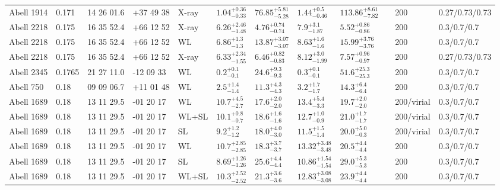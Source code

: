 \begin{landscape}
\begin{center}
{\begin{longtable}{llllllllllll}
Abell 1914 & 0.171 & 14 26 01.6 & +37 49 38 & X-ray & ${1.04}^{+0.36}_{-0.33}$ & ${76.85}^{+5.81}_{-5.28}$ & ${1.44}^{+0.5}_{-0.46}$ & ${113.86}^{+8.61}_{-7.82}$ & \citet{BA14.1} & 200 & 0.27/0.73/0.73 \\
Abell 2218 & 0.175 & 16 35 52.4 & +66 12 52 & X-ray & ${6.26}^{+2.46}_{-1.48}$ & ${4.76}^{+0.74}_{-0.74}$ & ${7.9}^{+3.1}_{-1.87}$ & ${5.52}^{+0.86}_{-0.86}$ & \citet{ET11.1} & 200 & 0.3/0.7/0.7 \\
Abell 2218 & 0.175 & 16 35 52.4 & +66 12 52 & WL & ${6.86}^{+1.3}_{-1.3}$ & ${13.87}^{+3.07}_{-3.07}$ & ${8.63}^{+1.6}_{-1.6}$ & ${15.99}^{+3.76}_{-3.76}$ & \citet{BA07.1} & 200 & 0.3/0.7/0.7 \\
Abell 2218 & 0.175 & 16 35 52.4 & +66 12 52 & X-ray & ${6.33}^{+2.34}_{-1.55}$ & ${6.46}^{+0.82}_{-0.83}$ & ${8.12}^{+3.0}_{-1.99}$ & ${7.57}^{+0.96}_{-0.97}$ & \citet{BA14.1} & 200 & 0.27/0.73/0.73 \\
Abell 2345 & 0.1765 & 21 27 11.0 & -12 09 33 & WL & ${0.2}^{+0.1}_{-0.1}$ & ${24.6}^{+9.3}_{-9.3}$ & ${0.3}^{+0.1}_{-0.1}$ & ${51.6}^{+25.3}_{-25.3}$ & \citet{SE14.1} & 200 & 0.3/0.7/0.7 \\
Abell 750 & 0.18 & 09 09 06.7 & +11 01 48 & WL & ${2.5}^{+1.4}_{-1.4}$ & ${11.3}^{+4.3}_{-4.3}$ & ${3.2}^{+1.7}_{-1.7}$ & ${14.3}^{+6.4}_{-6.4}$ & \citet{SE14.1} & 200 & 0.3/0.7/0.7 \\
Abell 1689 & 0.18 & 13 11 29.5 & -01 20 17 & WL & ${10.7}^{+4.5}_{-2.7}$ & ${17.6}^{+2.0}_{-2.0}$ & ${13.4}^{+5.4}_{-3.3}$ & ${19.7}^{+2.0}_{-2.0}$ & \citet{UM08.1} & 200/virial & 0.3/0.7/0.7 \\
Abell 1689 & 0.18 & 13 11 29.5 & -01 20 17 & WL+SL & ${10.1}^{+0.8}_{-0.7}$ & ${18.6}^{+1.6}_{-1.6}$ & ${12.7}^{+1.0}_{-0.9}$ & ${21.0}^{+1.7}_{-1.7}$ & \citet{UM08.1} & 200/virial & 0.3/0.7/0.7 \\
Abell 1689 & 0.18 & 13 11 29.5 & -01 20 17 & SL & ${9.2}^{+1.2}_{-1.2}$ & ${18.0}^{+4.0}_{-3.0}$ & ${11.5}^{+1.5}_{-1.4}$ & ${20.0}^{+5.0}_{-0.3}$ & \citet{CO10.1} & 200/virial & 0.3/0.7/0.7 \\
Abell 1689 & 0.18 & 13 11 29.5 & -01 20 17 & WL & ${10.7}^{+2.85}_{-2.85}$ & ${18.3}^{+3.7}_{-3.7}$ & ${13.32}^{+3.48}_{-3.48}$ & ${20.5}^{+4.4}_{-4.4}$ & \citet{UM15.1} & 200 & 0.3/0.7/0.7 \\
Abell 1689 & 0.18 & 13 11 29.5 & -01 20 17 & SL & ${8.69}^{+1.26}_{-1.26}$ & ${25.6}^{+4.4}_{-4.4}$ & ${10.86}^{+1.54}_{-1.54}$ & ${29.0}^{+5.3}_{-5.3}$ & \citet{UM15.1} & 200 & 0.3/0.7/0.7 \\
Abell 1689 & 0.18 & 13 11 29.5 & -01 20 17 & WL+SL & ${10.3}^{+2.52}_{-2.52}$ & ${21.3}^{+3.6}_{-3.6}$ & ${12.83}^{+3.08}_{-3.08}$ & ${23.9}^{+4.4}_{-4.4}$ & \citet{UM15.1} & 200 & 0.3/0.7/0.7 \\

\end{longtable}}
\end{center}
\end{landscape}
